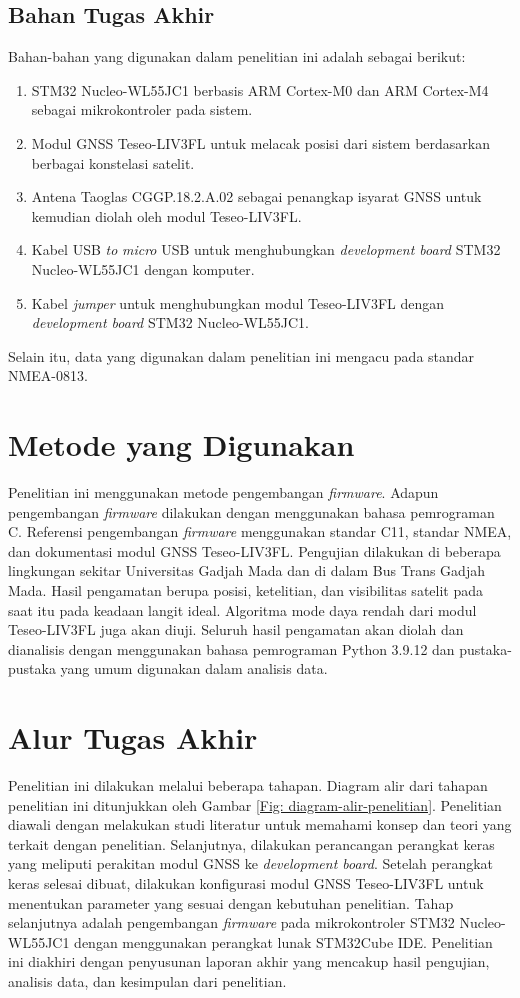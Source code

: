 \subsection{Bahan Tugas Akhir}
Bahan-bahan yang digunakan dalam penelitian ini adalah sebagai berikut:
\begin{enumerate}
	\item STM32 Nucleo-WL55JC1 berbasis ARM Cortex-M0 dan ARM Cortex-M4 sebagai mikrokontroler pada sistem.
	\item Modul GNSS Teseo\hyp{}LIV3FL untuk melacak posisi dari sistem berdasarkan berbagai konstelasi satelit.
	\item Antena Taoglas CGGP.18.2.A.02 sebagai penangkap isyarat GNSS untuk kemudian diolah oleh modul Teseo\hyp{}LIV3FL.
	\item Kabel USB \textit{to} \textit{micro} USB untuk menghubungkan \textit{development board} STM32 Nucleo-WL55JC1 dengan komputer.
	\item Kabel \textit{jumper} untuk menghubungkan modul Teseo\hyp{}LIV3FL dengan \textit{development board} STM32 Nucleo-WL55JC1.
\end{enumerate}
Selain itu, data yang digunakan dalam penelitian ini mengacu pada standar NMEA-0813.

\section{Metode yang Digunakan}
Penelitian ini menggunakan metode pengembangan \textit{firmware}. Adapun pengembangan \textit{firmware} dilakukan dengan menggunakan bahasa pemrograman C. Referensi pengembangan \textit{firmware} menggunakan standar C11, standar NMEA, dan dokumentasi modul GNSS Teseo\hyp{}LIV3FL. Pengujian dilakukan di beberapa lingkungan sekitar Universitas Gadjah Mada dan di dalam Bus Trans Gadjah Mada. Hasil pengamatan berupa posisi, ketelitian, dan visibilitas satelit pada saat itu pada keadaan langit ideal. Algoritma mode daya rendah dari modul Teseo\hyp{}LIV3FL juga akan diuji. Seluruh hasil pengamatan akan diolah dan dianalisis dengan menggunakan bahasa pemrograman Python 3.9.12 dan pustaka-pustaka yang umum digunakan dalam analisis data.

\section{Alur Tugas Akhir}
Penelitian ini dilakukan melalui beberapa tahapan. Diagram alir dari tahapan penelitian ini ditunjukkan oleh Gambar \ref{Fig: diagram-alir-penelitian}. Penelitian diawali dengan melakukan studi literatur untuk memahami konsep dan teori yang terkait dengan penelitian. Selanjutnya, dilakukan perancangan perangkat keras yang meliputi perakitan modul GNSS ke \textit{development board}. Setelah perangkat keras selesai dibuat, dilakukan konfigurasi modul GNSS Teseo\hyp{}LIV3FL untuk menentukan parameter yang sesuai dengan kebutuhan penelitian. Tahap selanjutnya adalah pengembangan \textit{firmware} pada mikrokontroler STM32 Nucleo-WL55JC1 dengan menggunakan perangkat lunak STM32Cube IDE. Penelitian ini diakhiri dengan penyusunan laporan akhir yang mencakup hasil pengujian, analisis data, dan kesimpulan dari penelitian.

